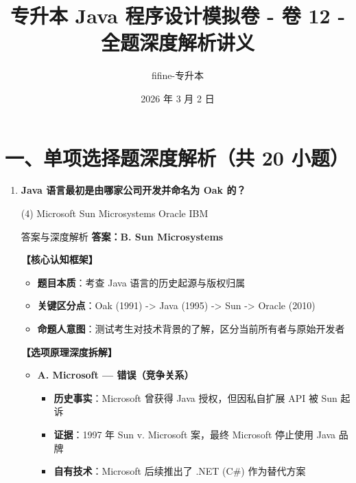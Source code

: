 \documentclass[12pt, a4paper]{ctexart}
\begin{document}
\title{\textcolor{myblue}{\textbf{专升本 Java 程序设计模拟卷 - 卷 12 - 全题深度解析讲义}}}
\author{fifine-专升本}
\date{2026 年 3 月 2 日}
\maketitle
\thispagestyle{empty}
\newpage

\section*{一、单项选择题深度解析（共 20 小题）}

\begin{enumerate}[label=\textbf{\arabic*.}, itemsep=1em]
    \item \textbf{Java 语言最初是由哪家公司开发并命名为 Oak 的？}
    \begin{tasks}(4)
        \task Microsoft \task Sun Microsystems \task Oracle \task IBM
    \end{tasks}
    
    \begin{bluebox}{答案与深度解析}
    \textbf{答案：B. Sun Microsystems}
    
    \textbf{【核心认知框架】}
    \begin{itemize}[leftmargin=*, nosep]
        \item \textbf{题目本质}：考查 Java 语言的历史起源与版权归属
        \item \textbf{关键区分点}：Oak (1991) -> Java (1995) -> Sun -> Oracle (2010)
        \item \textbf{命题人意图}：测试考生对技术背景的了解，区分当前所有者与原始开发者
    \end{itemize}
    
    \textbf{【选项原理深度拆解】}
    \begin{itemize}[leftmargin=*, nosep]
        \item \textbf{A. Microsoft — 错误（竞争关系）}
        \begin{itemize}[leftmargin=*, nosep]
            \item \textbf{历史事实}：Microsoft 曾获得 Java 授权，但因私自扩展 API 被 Sun 起诉
            \item \textbf{证据}：1997 年 Sun v. Microsoft 案，最终 Microsoft 停止使用 Java 品牌
            \item \textbf{自有技术}：Microsoft 后续推出了 .NET (C\#) 作为替代方案
        \end{itemize}
        

\end{itemize}
\end{bluebox}
\end{enumerate}
\end{document}

